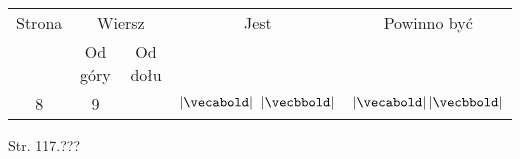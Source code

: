 \documentclass[a4paper,11pt]{article}
\begin{document}
\vspace{\spaceFour}










\begin{center}

  \begin{tabular}{|c|c|c|c|c|}
    \hline
    Strona & \multicolumn{2}{c|}{Wiersz} & Jest
                              & Powinno być \\ \cline{2-3}
    & Od góry & Od dołu & & \\
    \hline
    8   &  9 & & $| \vecabold | \;\; | \vecbbold |$
           & $| \vecabold | \, | \vecbbold |$ \\
    \hline
  \end{tabular}

\end{center}

\vspace{\spaceTwo}


















\newpage




Str. 117.???





\end{document}
